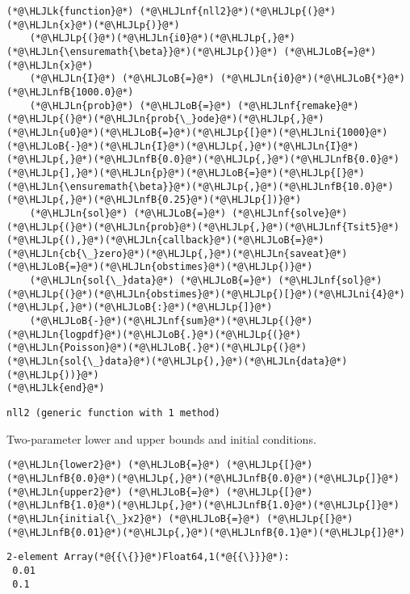 \documentclass[12pt,a4paper]{article}
\newcommand{\HLJLk}[1]{\textcolor[RGB]{148,91,176}{\textbf{#1}}}
\newcommand{\HLJLn}[1]{#1}
\newcommand{\HLJLnf}[1]{\textcolor[RGB]{66,102,213}{#1}}
\newcommand{\HLJLnfB}[1]{\textcolor[RGB]{59,151,46}{#1}}
\newcommand{\HLJLni}[1]{\textcolor[RGB]{59,151,46}{#1}}
\newcommand{\HLJLoB}[1]{\textcolor[RGB]{102,102,102}{\textbf{#1}}}
\newcommand{\HLJLp}[1]{#1}
\begin{document}
\begin{lstlisting}
(*@\HLJLk{function}@*) (*@\HLJLnf{nll2}@*)(*@\HLJLp{(}@*)(*@\HLJLn{x}@*)(*@\HLJLp{)}@*)
    (*@\HLJLp{(}@*)(*@\HLJLn{i0}@*)(*@\HLJLp{,}@*)(*@\HLJLn{\ensuremath{\beta}}@*)(*@\HLJLp{)}@*) (*@\HLJLoB{=}@*) (*@\HLJLn{x}@*)
    (*@\HLJLn{I}@*) (*@\HLJLoB{=}@*) (*@\HLJLn{i0}@*)(*@\HLJLoB{*}@*)(*@\HLJLnfB{1000.0}@*)
    (*@\HLJLn{prob}@*) (*@\HLJLoB{=}@*) (*@\HLJLnf{remake}@*)(*@\HLJLp{(}@*)(*@\HLJLn{prob{\_}ode}@*)(*@\HLJLp{,}@*)(*@\HLJLn{u0}@*)(*@\HLJLoB{=}@*)(*@\HLJLp{[}@*)(*@\HLJLni{1000}@*)(*@\HLJLoB{-}@*)(*@\HLJLn{I}@*)(*@\HLJLp{,}@*)(*@\HLJLn{I}@*)(*@\HLJLp{,}@*)(*@\HLJLnfB{0.0}@*)(*@\HLJLp{,}@*)(*@\HLJLnfB{0.0}@*)(*@\HLJLp{],}@*)(*@\HLJLn{p}@*)(*@\HLJLoB{=}@*)(*@\HLJLp{[}@*)(*@\HLJLn{\ensuremath{\beta}}@*)(*@\HLJLp{,}@*)(*@\HLJLnfB{10.0}@*)(*@\HLJLp{,}@*)(*@\HLJLnfB{0.25}@*)(*@\HLJLp{])}@*)
    (*@\HLJLn{sol}@*) (*@\HLJLoB{=}@*) (*@\HLJLnf{solve}@*)(*@\HLJLp{(}@*)(*@\HLJLn{prob}@*)(*@\HLJLp{,}@*)(*@\HLJLnf{Tsit5}@*)(*@\HLJLp{(),}@*)(*@\HLJLn{callback}@*)(*@\HLJLoB{=}@*)(*@\HLJLn{cb{\_}zero}@*)(*@\HLJLp{,}@*)(*@\HLJLn{saveat}@*)(*@\HLJLoB{=}@*)(*@\HLJLn{obstimes}@*)(*@\HLJLp{)}@*)
    (*@\HLJLn{sol{\_}data}@*) (*@\HLJLoB{=}@*) (*@\HLJLnf{sol}@*)(*@\HLJLp{(}@*)(*@\HLJLn{obstimes}@*)(*@\HLJLp{)[}@*)(*@\HLJLni{4}@*)(*@\HLJLp{,}@*)(*@\HLJLoB{:}@*)(*@\HLJLp{]}@*)
    (*@\HLJLoB{-}@*)(*@\HLJLnf{sum}@*)(*@\HLJLp{(}@*)(*@\HLJLn{logpdf}@*)(*@\HLJLoB{.}@*)(*@\HLJLp{(}@*)(*@\HLJLn{Poisson}@*)(*@\HLJLoB{.}@*)(*@\HLJLp{(}@*)(*@\HLJLn{sol{\_}data}@*)(*@\HLJLp{),}@*)(*@\HLJLn{data}@*)(*@\HLJLp{))}@*)
(*@\HLJLk{end}@*)
\end{lstlisting}

\begin{lstlisting}
nll2 (generic function with 1 method)
\end{lstlisting}


Two-parameter lower and upper bounds and initial conditions.


\begin{lstlisting}
(*@\HLJLn{lower2}@*) (*@\HLJLoB{=}@*) (*@\HLJLp{[}@*)(*@\HLJLnfB{0.0}@*)(*@\HLJLp{,}@*)(*@\HLJLnfB{0.0}@*)(*@\HLJLp{]}@*)
(*@\HLJLn{upper2}@*) (*@\HLJLoB{=}@*) (*@\HLJLp{[}@*)(*@\HLJLnfB{1.0}@*)(*@\HLJLp{,}@*)(*@\HLJLnfB{1.0}@*)(*@\HLJLp{]}@*)
(*@\HLJLn{initial{\_}x2}@*) (*@\HLJLoB{=}@*) (*@\HLJLp{[}@*)(*@\HLJLnfB{0.01}@*)(*@\HLJLp{,}@*)(*@\HLJLnfB{0.1}@*)(*@\HLJLp{]}@*)
\end{lstlisting}

\begin{lstlisting}
2-element Array(*@{{\{}}@*)Float64,1(*@{{\}}}@*):
 0.01
 0.1
\end{lstlisting}
\end{document}
